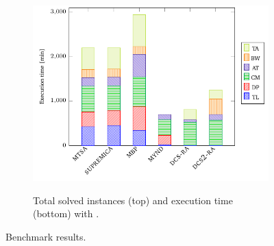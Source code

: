 \begin{figure}[th]
\begin{subfigure}{0.5\textwidth}
        \includegraphics[width=\linewidth]{figures/benchmark/tools_time.pdf}\label{fig:tools:results:time}
        \caption{Total solved instances (top) and execution time (bottom) with \DCS.}
    \end{subfigure}
\caption{Benchmark results.}
\label{fig:tools:results}
\end{figure}










